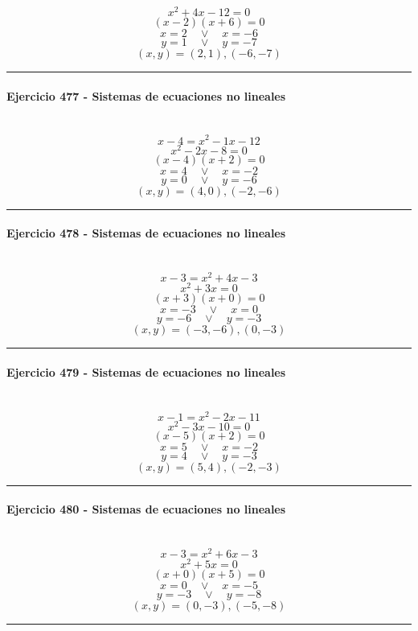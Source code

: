 \documentclass[10pt,a4paper]{article}
\newcommand{\res}[1]{\paragraph{#1}\mbox{}\\[-1.2em]}
\begin{document}
\[ x^{2} + 4 x - 12=0 \]
\[ (x-2)(x+6)=0 \]
\[ x=2\quad \vee \quad x=-6 \]
\[ y=1\quad \vee \quad y=-7 \]
\[ \boxed{(x,y)=(2,1),(-6,-7)} \]
\vspace{1mm}\hrule\vspace{2mm}
\res{Ejercicio 477 - Sistemas de ecuaciones no lineales}
\[ x-4=x^2-1x-12 \]
\[ x^{2} - 2 x - 8=0 \]
\[ (x-4)(x+2)=0 \]
\[ x=4\quad \vee \quad x=-2 \]
\[ y=0\quad \vee \quad y=-6 \]
\[ \boxed{(x,y)=(4,0),(-2,-6)} \]
\vspace{1mm}\hrule\vspace{2mm}
\res{Ejercicio 478 - Sistemas de ecuaciones no lineales}
\[ x-3=x^2+4x-3 \]
\[ x^{2} + 3 x=0 \]
\[ (x+3)(x+0)=0 \]
\[ x=-3\quad \vee \quad x=0 \]
\[ y=-6\quad \vee \quad y=-3 \]
\[ \boxed{(x,y)=(-3,-6),(0,-3)} \]
\vspace{1mm}\hrule\vspace{2mm}
\res{Ejercicio 479 - Sistemas de ecuaciones no lineales}
\[ x-1=x^2-2x-11 \]
\[ x^{2} - 3 x - 10=0 \]
\[ (x-5)(x+2)=0 \]
\[ x=5\quad \vee \quad x=-2 \]
\[ y=4\quad \vee \quad y=-3 \]
\[ \boxed{(x,y)=(5,4),(-2,-3)} \]
\vspace{1mm}\hrule\vspace{2mm}
\res{Ejercicio 480 - Sistemas de ecuaciones no lineales}
\[ x-3=x^2+6x-3 \]
\[ x^{2} + 5 x=0 \]
\[ (x+0)(x+5)=0 \]
\[ x=0\quad \vee \quad x=-5 \]
\[ y=-3\quad \vee \quad y=-8 \]
\[ \boxed{(x,y)=(0,-3),(-5,-8)} \]
\vspace{1mm}\hrule\vspace{2mm}
\end{document}
